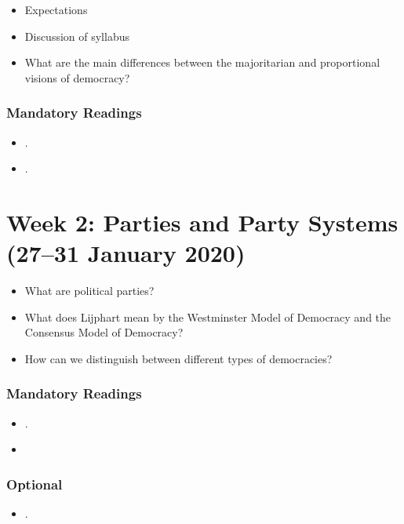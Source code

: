 \documentclass[abstract=on,parskip=full,headings=standardclasses,fontsize=11pt,paper=a4]{scrartcl}
\begin{document}
\begin{itemize}
\renewcommand\labelitemi{--}
\item Expectations
\item Discussion of syllabus
\item What are the main differences between the majoritarian and proportional visions of democracy?
\end{itemize}


\subsubsection*{Mandatory Readings}
\begin{itemize}
\item {}.
\item {}.
\end{itemize}


\section{Week 2: Parties and Party Systems (27--31 January 2020)}

\begin{itemize}
\renewcommand\labelitemi{--}
\item  What are political parties?
\item What does Lijphart mean by the Westminster Model of Democracy and the Consensus Model of Democracy?
\item How can we distinguish between different types of democracies?
\end{itemize}

\subsubsection*{Mandatory Readings}
\begin{itemize}
\item {}.
\item {}
\end{itemize}



\subsubsection*{Optional}
\begin{itemize}
\item {}.
\end{itemize}
\end{document}
